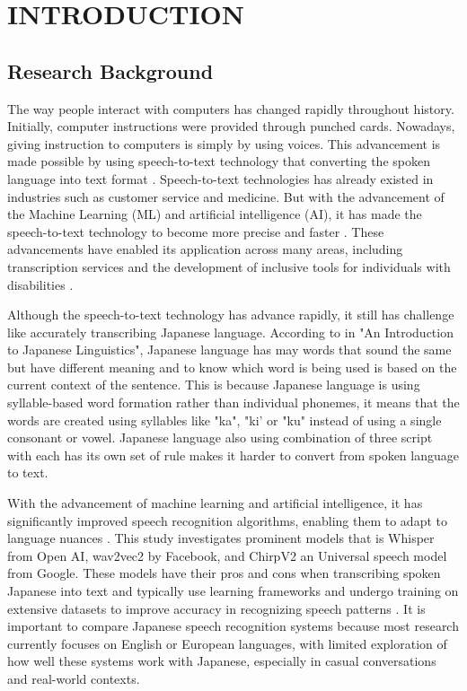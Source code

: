 \chapter{INTRODUCTION}
\label{ch:intro}

\section{Research Background}
\label{sec:intro-bg}

The way people interact with computers has changed rapidly throughout history. Initially, computer instructions were provided through punched cards. Nowadays, giving instruction to computers is simply by using voices. This advancement is made possible by using speech-to-text technology that converting the spoken language into text format \parencite{Xu}. Speech-to-text technologies has already existed in industries such as customer service and medicine. But with the advancement of the Machine Learning (ML) and artificial intelligence (AI), it has made the speech-to-text technology to become more precise and faster \parencite{latif2020}. These advancements have enabled its application across many areas, including transcription services and the development of inclusive tools for individuals with disabilities \parencite{Koenecke2020}.

Although the speech-to-text technology has advance rapidly, it still has challenge like accurately transcribing Japanese language. According to \textcite{Kanno} in "An Introduction to Japanese Linguistics", Japanese language has may words that sound the same but have different meaning and to know which word is being used is based on the current context of the sentence. This is because Japanese language is using syllable-based word formation rather than individual phonemes, it means that the words are created using syllables like "ka", "ki' or "ku" instead of using a single consonant or vowel. Japanese language also using combination of three script with each has its own set of rule makes it harder to convert from spoken language to text. 

With the advancement of machine learning and artificial intelligence, it has significantly improved speech recognition algorithms, enabling them to adapt to language nuances \parencite{xu2023recent}. This study investigates prominent models that is Whisper from Open AI, wav2vec2 by Facebook, and ChirpV2 an Universal speech model from Google. These models have their pros and cons when transcribing spoken Japanese into text and typically use learning frameworks and undergo training on extensive datasets to improve accuracy in recognizing speech patterns \parencite{ando2021}. It is important to compare Japanese speech recognition systems because most research currently focuses on English or European languages, with limited exploration of how well these systems work with Japanese, especially in casual conversations and real-world contexts.

